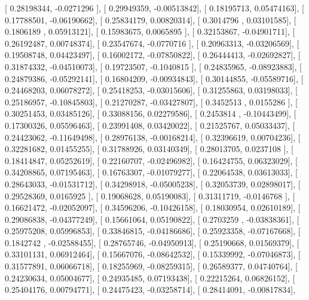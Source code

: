 \documentclass{article}
\begin{document}
       [ 0.28198344, -0.0271296 ],
       [ 0.29949359, -0.00513842],
       [ 0.18195713,  0.05474163],
       [ 0.17788501, -0.06190662],
       [ 0.25834179,  0.00820314],
       [ 0.3014796 ,  0.03101585],
       [ 0.1806189 ,  0.05913121],
       [ 0.15983675,  0.0065895 ],
       [ 0.32153867, -0.04901711],
       [ 0.26192487,  0.00748374],
       [ 0.23547674, -0.0770716 ],
       [ 0.20963313, -0.03206569],
       [ 0.19508748,  0.04423497],
       [ 0.16002172, -0.07850822],
       [ 0.26444413, -0.02692827],
       [ 0.31874332, -0.04510073],
       [ 0.19723507, -0.1040815 ],
       [ 0.24835965, -0.08923883],
       [ 0.24879386, -0.05292141],
       [ 0.16804209, -0.00934843],
       [ 0.30144855, -0.05589716],
       [ 0.24468203,  0.06078272],
       [ 0.25418253, -0.03015606],
       [ 0.31255863,  0.03198033],
       [ 0.25186957, -0.10845803],
       [ 0.21270287, -0.03427807],
       [ 0.3452513 ,  0.0155286 ],
       [ 0.30251453,  0.03485126],
       [ 0.33088156,  0.02279586],
       [ 0.2453814 , -0.10443499],
       [ 0.17300326,  0.05596463],
       [ 0.23991408,  0.03420022],
       [ 0.21525767,  0.05033437],
       [ 0.24423062, -0.11649498],
       [ 0.28976138, -0.00168214],
       [ 0.32396619,  0.00704236],
       [ 0.32281682,  0.01455255],
       [ 0.31788926,  0.03140349],
       [ 0.28013705,  0.0237108 ],
       [ 0.18414847,  0.05252619],
       [ 0.22160707, -0.02496982],
       [ 0.16424755,  0.06323029],
       [ 0.34208865,  0.07195463],
       [ 0.16763307, -0.01079277],
       [ 0.22064538,  0.03613033],
       [ 0.28643033, -0.01531712],
       [ 0.34298918, -0.05005238],
       [ 0.32053739,  0.02898017],
       [ 0.29528369,  0.0165925 ],
       [ 0.19068628,  0.05190083],
       [ 0.31311719, -0.0146768 ],
       [ 0.16621472, -0.02052097],
       [ 0.34596206, -0.10426158],
       [ 0.18030954,  0.02610189],
       [ 0.29086838, -0.04377249],
       [ 0.15661064,  0.05190822],
       [ 0.2703259 , -0.03838361],
       [ 0.25975208,  0.05996853],
       [ 0.33846815, -0.04186686],
       [ 0.25923358, -0.07167668],
       [ 0.1842742 , -0.02588455],
       [ 0.28765746, -0.04950913],
       [ 0.25190668,  0.01569379],
       [ 0.33101131,  0.06912464],
       [ 0.15667076, -0.08642532],
       [ 0.15339992, -0.07046873],
       [ 0.31577891,  0.06066718],
       [ 0.18255969, -0.08259315],
       [ 0.26589377,  0.04740764],
       [ 0.24230634,  0.05004677],
       [ 0.24935485,  0.07193438],
       [ 0.22215264,  0.06826152],
       [ 0.25404176,  0.00794771],
       [ 0.24475423, -0.03258714],
       [ 0.28414091, -0.00817834],
\end{document}

